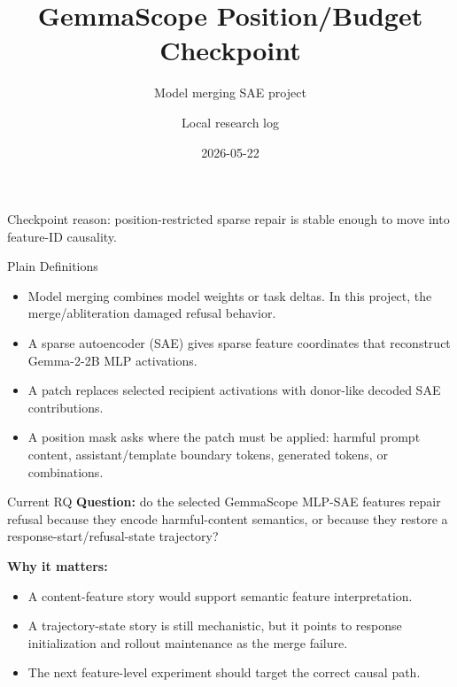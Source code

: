 \documentclass[aspectratio=169]{beamer}
\title{GemmaScope Position/Budget Checkpoint}
\subtitle{Model merging SAE project}
\author{Local research log}
\date{2026-05-22}
\begin{document}
\begin{frame}
  \titlepage
  \vspace{-0.6cm}
  \begin{center}
    Checkpoint reason: position-restricted sparse repair is stable enough to move into feature-ID causality.
  \end{center}
\end{frame}

\begin{frame}{Plain Definitions}
  \begin{itemize}
    \item Model merging combines model weights or task deltas. In this project, the merge/abliteration damaged refusal behavior.
    \item A sparse autoencoder (SAE) gives sparse feature coordinates that reconstruct Gemma-2-2B MLP activations.
    \item A patch replaces selected recipient activations with donor-like decoded SAE contributions.
    \item A position mask asks where the patch must be applied: harmful prompt content, assistant/template boundary tokens, generated tokens, or combinations.
  \end{itemize}
\end{frame}

\begin{frame}{Current RQ}
  \textbf{Question:} do the selected GemmaScope MLP-SAE features repair refusal because they encode harmful-content semantics, or because they restore a response-start/refusal-state trajectory?

  \vspace{0.35cm}
  \textbf{Why it matters:}
  \begin{itemize}
    \item A content-feature story would support semantic feature interpretation.
    \item A trajectory-state story is still mechanistic, but it points to response initialization and rollout maintenance as the merge failure.
    \item The next feature-level experiment should target the correct causal path.
  \end{itemize}
\end{frame}
\end{document}
